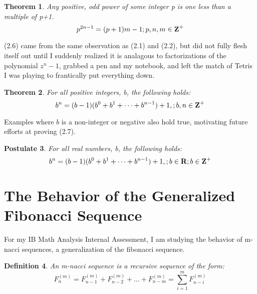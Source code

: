 \documentclass{article}
\newtheorem{theorem}{Theorem}[section]
\newtheorem{definition}[theorem]{Definition}
\newtheorem{postulate}[theorem]{Postulate}
\begin{document}
\begin{theorem}
    Any positive, odd power of some integer \mbox{p} is one less than a multiple of \mbox{p+1}. 
    $$p^{2n-1}=(p+1)m-1;p,n,m\in\mbox{\textbf{Z}}^+$$
\end{theorem}

(2.6) came from the same observation as (2.1) and (2.2), but did not fully flesh itself out until I suddenly realized it is analagous to factorizations of the polynomial $z^n-1$, grabbed a pen and my notebook, and left the match of Tetris I was playing to frantically put everything down. 

\begin{theorem}
    For all positive integers, b, the following holds:
    $$b^n=(b-1)(b^0+b^1+\dots+b^{n-1})+1,;b,n\in\mbox{\textbf{Z}}^+$$
\end{theorem}

Examples where $b$ is a non-integer or negative also hold true, motivating future efforts at proving (2.7).

\begin{postulate}
    For all real numbers, b, the following holds:
    $$b^n=(b-1)(b^0+b^1+\dots+b^{n-1})+1,;b\in\mbox{\textbf{R}};b\in\mbox{\textbf{Z}}^+$$
\end{postulate}

\section{The Behavior of the Generalized Fibonacci Sequence}

For my IB Math Analysis Internal Assessment, I am studying the behavior of m-nacci sequences, a generalization of the fibonacci sequence.

\begin{definition}
An m-nacci sequence is a recursive sequence of the form:
$$F^{(m)}_n=F^{(m)}_{n-1}+F^{(m)}_{n-2}+\dots+F^{(m)}_{n-m}=\sum_{i=1}^m F^{(m)}_{n-i}$$
\end{definition}
\end{document}
